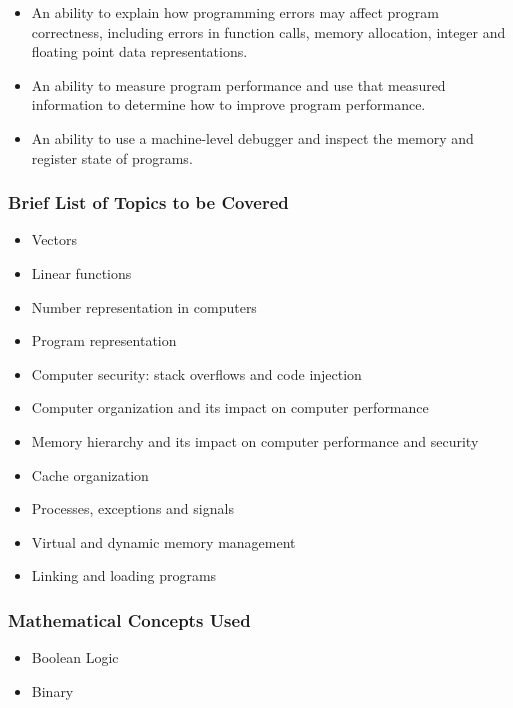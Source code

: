 {\begin{highlight}[\CSPBCompSys]
\begin{itemize}
            \item An ability to explain how programming errors may affect program correctness, including errors in function calls, memory allocation, integer and floating point data representations.
            \item An ability to measure program performance and use that measured information to determine how to improve program performance.
            \item An ability to use a machine-level debugger and inspect the memory and register state of programs.
        \end{itemize}
        
        \subsubsection*{Brief List of Topics to be Covered}

        \begin{itemize}
            \item Vectors
            \item Linear functions
            \item Number representation in computers
            \item Program representation
            \item Computer security: stack overflows and code injection
            \item Computer organization and its impact on computer performance
            \item Memory hierarchy and its impact on computer performance and security
            \item Cache organization
            \item Processes, exceptions and signals
            \item Virtual and dynamic memory management
            \item Linking and loading programs
        \end{itemize}
        
        \subsubsection*{Mathematical Concepts Used}

        \begin{itemize}
            \item Boolean Logic
            \item Binary
        \end{itemize}
    \end{highlight}
}

